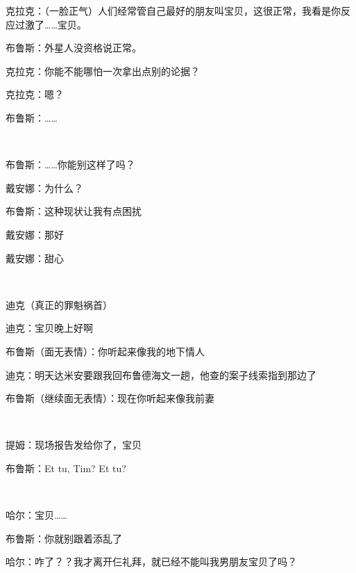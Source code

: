 克拉克：（一脸正气）人们经常管自己最好的朋友叫宝贝，这很正常，我看是你反应过激了……宝贝。

布鲁斯：外星人没资格说正常。

克拉克：你能不能哪怕一次拿出点别的论据？

克拉克：嗯？

布鲁斯：……

~\

布鲁斯：……你能别这样了吗？

戴安娜：为什么？

布鲁斯：这种现状让我有点困扰

戴安娜：那好

戴安娜：甜心

~\

迪克（真正的罪魁祸首）

迪克：宝贝晚上好啊

布鲁斯（面无表情）：你听起来像我的地下情人

迪克：明天达米安要跟我回布鲁德海文一趟，他查的案子线索指到那边了

布鲁斯（继续面无表情）：现在你听起来像我前妻

~\

提姆：现场报告发给你了，宝贝

布鲁斯：Et tu, Tim? Et tu?

~\

哈尔：宝贝……

布鲁斯：你就别跟着添乱了

哈尔：咋了？？我才离开仨礼拜，就已经不能叫我男朋友宝贝了吗？

~\

